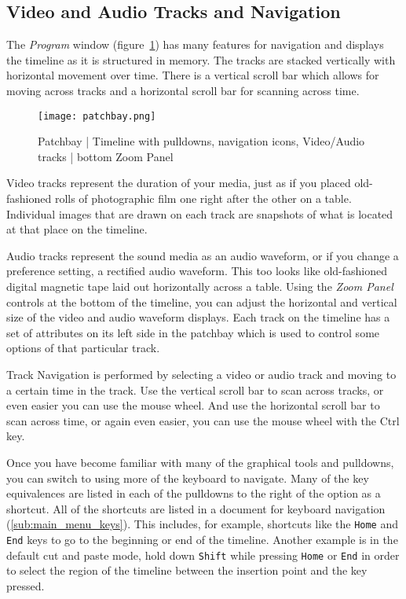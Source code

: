 \subsection{Video and Audio Tracks and Navigation}%
\label{sub:video_and_audio_tracks_and_navigation}

The \textit{Program} window (figure~\ref{fig:patchbay}) has many features for navigation and displays the timeline as it is structured in memory. The tracks are stacked vertically with horizontal movement over time.
There is a vertical scroll bar which allows for moving across tracks and a horizontal scroll bar for scanning across time. 

\begin{figure}[htpb]
    \centering
    \texttt{[image: patchbay.png]}
    \caption{Patchbay  | Timeline with pulldowns, navigation icons, Video/Audio tracks | bottom Zoom Panel}
    \label{fig:patchbay}
\end{figure}

Video tracks represent the duration of your media, just as if you placed old-fashioned rolls of photographic
film one right after the other on a table.
Individual images that are drawn on each track are snapshots of what is located at that place on the timeline.

Audio tracks represent the sound media as an audio waveform, or if you change a preference setting, a rectified audio waveform. 
This too looks like old-fashioned digital magnetic tape laid out horizontally across a table.
Using the \textit{Zoom Panel} controls at the bottom of the timeline,
you can adjust the horizontal and vertical size of the video and audio waveform displays.
Each track on the timeline has a set of attributes on its left side in the patchbay which is used to 
control some options of that particular track. 

Track Navigation is performed by selecting a video or audio track and moving to a certain time in the track. 
Use the vertical scroll bar to scan across tracks, or even easier you can use the mouse wheel. 
And use the horizontal scroll bar to scan across time, or again even easier, you can use the mouse wheel with the Ctrl key.  

Once you have become familiar with many of the graphical tools and pulldowns, you can switch to using more of
the keyboard to navigate.  Many of the key equivalences are listed in each of the pulldowns to the right of the option
 as a shortcut. All of the shortcuts are listed in a document for keyboard 
navigation (\ref{sub:main_menu_keys}). This includes, for example, shortcuts like the \texttt{Home} and \texttt{End} keys to go to the beginning or end of the timeline.  
Another example is in the default cut and paste mode, hold down \texttt{Shift} while pressing \texttt{Home} or \texttt{End} in order to select the region of the timeline between the insertion point and the key pressed.

